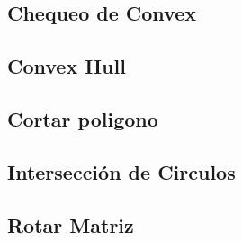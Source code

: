 \subsection{Chequeo de Convex}


\subsection{Convex Hull}


\subsection{Cortar poligono}


\subsection{Intersecci\'on de Circulos}


\subsection{Rotar Matriz}

